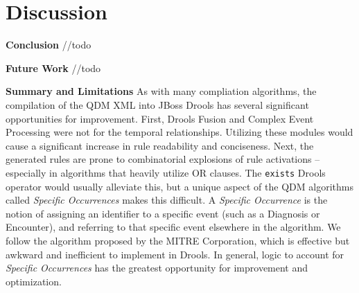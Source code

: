\documentclass{amia}
\begin{document}
\section*{Discussion}
\textbf{Conclusion}
//todo

\textbf{Future Work}
//todo

\textbf{Summary and Limitations}
As with many compliation algorithms, the compilation of the QDM XML into JBoss Drools has several significant opportunities for improvement. First, Drools Fusion and Complex Event Processing\cite{bali2013drools} were not for the temporal relationships. Utilizing these modules would cause a significant increase in rule readability and conciseness. Next, the generated rules are prone to combinatorial explosions of rule activations -- especially in algorithms that heavily utilize OR clauses. The \texttt{exists} Drools operator would usually alleviate this, but a unique aspect of the QDM algorithms called \textit{Specific Occurrences} makes this difficult. A \textit{Specific Occurrence} is the notion of assigning an identifier to a specific event (such as a Diagnosis or Encounter), and referring to that specific event elsewhere in the algorithm. We follow the algorithm proposed by the MITRE Corporation\cite{specific_occurences}, which is effective but awkward and inefficient to implement in Drools. In general, logic to account for \textit{Specific Occurrences} has the greatest opportunity for improvement and optimization.


\clearpage


  
\end{document}

